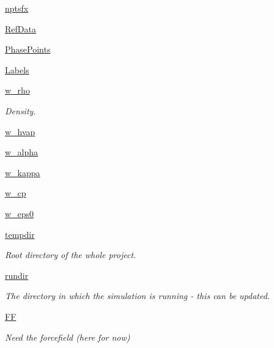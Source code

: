 \begin{DoxyCompactItemize}
\hyperlink{classforcebalance_1_1liquid_1_1Liquid_a4125a209929444b7cbfbd60b466dc763}{nptsfx}
\item 
\hyperlink{classforcebalance_1_1liquid_1_1Liquid_a472f32bbaf18b8ead19b9156f305b8fc}{Ref\-Data}
\item 
\hyperlink{classforcebalance_1_1liquid_1_1Liquid_a2c10490d9073a069bd19361f386422ef}{Phase\-Points}
\item 
\hyperlink{classforcebalance_1_1liquid_1_1Liquid_a50f976d2d3d6a1c261756035a26390e2}{Labels}
\item 
\hyperlink{classforcebalance_1_1liquid_1_1Liquid_aef8ad1dda086bde6f48130d273af9784}{w\-\_\-rho}
\begin{DoxyCompactList}\small\item\em Density. \end{DoxyCompactList}\item 
\hyperlink{classforcebalance_1_1liquid_1_1Liquid_abe985fe3aaa03d9f3a1b0a90f26b774d}{w\-\_\-hvap}
\item 
\hyperlink{classforcebalance_1_1liquid_1_1Liquid_a0d36d27d8c406b53bbb1096fbb76adbb}{w\-\_\-alpha}
\item 
\hyperlink{classforcebalance_1_1liquid_1_1Liquid_a6b262d9343247a902063bf62d5f19108}{w\-\_\-kappa}
\item 
\hyperlink{classforcebalance_1_1liquid_1_1Liquid_a3809c649d95ac6c9f662d599e6b1b93d}{w\-\_\-cp}
\item 
\hyperlink{classforcebalance_1_1liquid_1_1Liquid_a75ad3ea94ec845e91499f858e7be5f27}{w\-\_\-eps0}
\item 
\hyperlink{classforcebalance_1_1target_1_1Target_aa1f01b5b78db253b5b66384ed11ed193}{tempdir}
\begin{DoxyCompactList}\small\item\em Root directory of the whole project. \end{DoxyCompactList}\item 
\hyperlink{classforcebalance_1_1target_1_1Target_a6872de5b2d4273b82336ea5b0da29c9e}{rundir}
\begin{DoxyCompactList}\small\item\em The directory in which the simulation is running -\/ this can be updated. \end{DoxyCompactList}\item 
\hyperlink{classforcebalance_1_1target_1_1Target_a38a37919783141ea37fdcf8b00ce0aaf}{F\-F}
\begin{DoxyCompactList}\small\item\em Need the forcefield (here for now) \end{DoxyCompactList}\item 

\end{DoxyCompactItemize}
